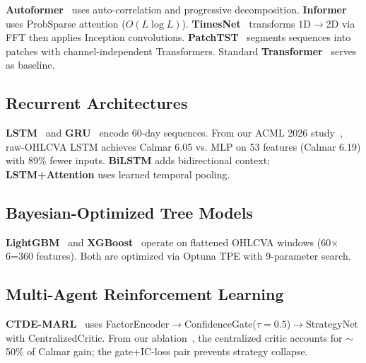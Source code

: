 \documentclass[sigconf,10pt]{acmart}
\begin{document}
\textbf{Autoformer}~\cite{wu2021autoformer} uses auto-correlation and progressive decomposition. \textbf{Informer}~\cite{zhou2021informer} uses ProbSparse attention ($O(L \log L)$). \textbf{TimesNet}~\cite{wu2023timesnet} transforms 1D$\to$2D via FFT then applies Inception convolutions. \textbf{PatchTST}~\cite{nie2023patchtst} segments sequences into patches with channel-independent Transformers. Standard \textbf{Transformer}~\cite{vaswani2017attention} serves as baseline.

\subsection{Recurrent Architectures}

\textbf{LSTM}~\cite{hochreiter1997long} and \textbf{GRU}~\cite{cho2014learning} encode 60-day sequences. From our ACML 2026 study~\cite{ctde2026acml}, raw-OHLCVA LSTM achieves Calmar 6.05 vs. MLP on 53 features (Calmar 6.19) with 89\% fewer inputs. \textbf{BiLSTM} adds bidirectional context; \textbf{LSTM+Attention} uses learned temporal pooling.

\subsection{Bayesian-Optimized Tree Models}

\textbf{LightGBM}~\cite{ke2017lightgbm} and \textbf{XGBoost}~\cite{chen2016xgboost} operate on flattened OHLCVA windows (60$\times$6=360 features). Both are optimized via Optuna TPE with 9-parameter search.

\subsection{Multi-Agent Reinforcement Learning}

\textbf{CTDE-MARL}~\cite{ctde2026acml,lowe2017multi} uses FactorEncoder$\to$ConfidenceGate($\tau{=}0.5$)$\to$StrategyNet with CentralizedCritic. From our ablation~\cite{ctde2026acml}, the centralized critic accounts for $\sim$50\% of Calmar gain; the gate+IC-loss pair prevents strategy collapse.
\end{document}
